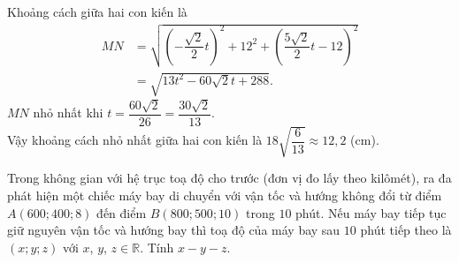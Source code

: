 \begin{ex}
{{
}
\noindent 
Khoảng cách giữa hai con kiến là 
\begin{align*}
MN &= \sqrt{ \left (-\dfrac{\sqrt{2}}{2} t \right )^2+12^2 + \left (\dfrac{5\sqrt{2}}{2}t -12\right )^2 } \\
& = \sqrt{13 t^2-60 \sqrt{2} t+288}.
\end{align*}
$MN$ nhỏ nhất khi $t= \dfrac{60\sqrt{2}}{26} = \dfrac{30\sqrt{2}}{13} $. \\
Vậy khoảng cách nhỏ nhất giữa hai con kiến là $18 \sqrt{\dfrac{6}{13}} \approx 12{,}2$ (cm).
}
\end{ex}

\begin{ex}%
Trong không gian với hệ trục toạ độ cho trước (đơn vị đo lấy theo kilômét), ra đa phát hiện một chiếc máy bay di chuyển với vận tốc và hướng không đổi từ điểm $A(600; 400; 8)$ đến điểm $B(800; 500; 10)$ trong $10$ phút. Nếu máy bay tiếp tục giữ nguyên vận tốc và hướng bay thì toạ độ của máy bay sau $10$ phút tiếp theo là $(x;y;z)$ với $x$, $y$, $z\in \mathbb{R}$. Tính $x-y-z$.
\end{ex}

